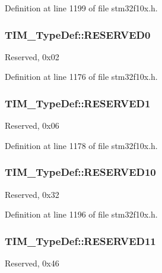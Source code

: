 Definition at line 1199 of file stm32f10x.\-h.

\hypertarget{struct_t_i_m___type_def_a88caad1e82960cc6df99d935ece26c1b}{
\subsubsection[{R\-E\-S\-E\-R\-V\-E\-D0}]{ T\-I\-M\-\_\-\-Type\-Def\-::\-R\-E\-S\-E\-R\-V\-E\-D0}}\label{struct_t_i_m___type_def_a88caad1e82960cc6df99d935ece26c1b}
Reserved, 0x02 

Definition at line 1176 of file stm32f10x.\-h.

\hypertarget{struct_t_i_m___type_def_a59c46ac3a56c6966a7f8f379a2fd1e3e}{
\subsubsection[{R\-E\-S\-E\-R\-V\-E\-D1}]{ T\-I\-M\-\_\-\-Type\-Def\-::\-R\-E\-S\-E\-R\-V\-E\-D1}}\label{struct_t_i_m___type_def_a59c46ac3a56c6966a7f8f379a2fd1e3e}
Reserved, 0x06 

Definition at line 1178 of file stm32f10x.\-h.

\hypertarget{struct_t_i_m___type_def_ab0e228ff39a37b472aa48ba3afd18333}{
\subsubsection[{R\-E\-S\-E\-R\-V\-E\-D10}]{ T\-I\-M\-\_\-\-Type\-Def\-::\-R\-E\-S\-E\-R\-V\-E\-D10}}\label{struct_t_i_m___type_def_ab0e228ff39a37b472aa48ba3afd18333}
Reserved, 0x32 

Definition at line 1196 of file stm32f10x.\-h.

\hypertarget{struct_t_i_m___type_def_a7a96436f300141eb48768ffa90ee6e71}{
\subsubsection[{R\-E\-S\-E\-R\-V\-E\-D11}]{ T\-I\-M\-\_\-\-Type\-Def\-::\-R\-E\-S\-E\-R\-V\-E\-D11}}\label{struct_t_i_m___type_def_a7a96436f300141eb48768ffa90ee6e71}
Reserved, 0x46 

